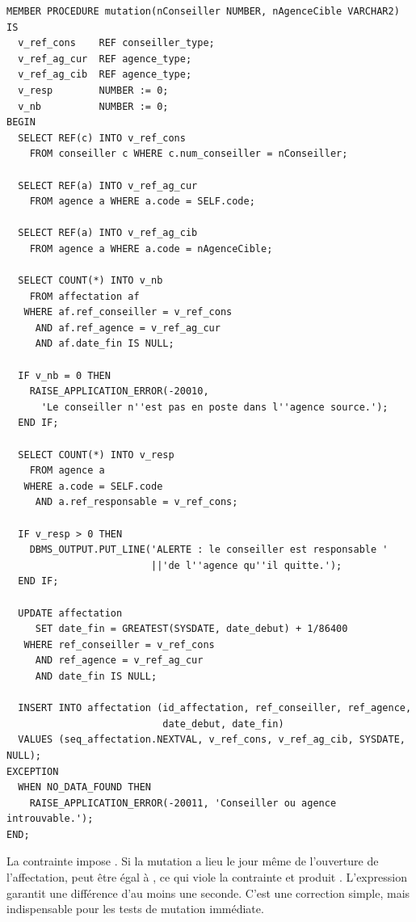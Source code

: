 \begin{lstlisting}[caption={Méthode \code{mutation} de la vue objet.},label={lst:e12-mutation}]
MEMBER PROCEDURE mutation(nConseiller NUMBER, nAgenceCible VARCHAR2) IS
  v_ref_cons    REF conseiller_type;
  v_ref_ag_cur  REF agence_type;
  v_ref_ag_cib  REF agence_type;
  v_resp        NUMBER := 0;
  v_nb          NUMBER := 0;
BEGIN
  SELECT REF(c) INTO v_ref_cons
    FROM conseiller c WHERE c.num_conseiller = nConseiller;

  SELECT REF(a) INTO v_ref_ag_cur
    FROM agence a WHERE a.code = SELF.code;

  SELECT REF(a) INTO v_ref_ag_cib
    FROM agence a WHERE a.code = nAgenceCible;

  SELECT COUNT(*) INTO v_nb
    FROM affectation af
   WHERE af.ref_conseiller = v_ref_cons
     AND af.ref_agence = v_ref_ag_cur
     AND af.date_fin IS NULL;

  IF v_nb = 0 THEN
    RAISE_APPLICATION_ERROR(-20010,
      'Le conseiller n''est pas en poste dans l''agence source.');
  END IF;

  SELECT COUNT(*) INTO v_resp
    FROM agence a
   WHERE a.code = SELF.code
     AND a.ref_responsable = v_ref_cons;

  IF v_resp > 0 THEN
    DBMS_OUTPUT.PUT_LINE('ALERTE : le conseiller est responsable '
                         ||'de l''agence qu''il quitte.');
  END IF;

  UPDATE affectation
     SET date_fin = GREATEST(SYSDATE, date_debut) + 1/86400
   WHERE ref_conseiller = v_ref_cons
     AND ref_agence = v_ref_ag_cur
     AND date_fin IS NULL;

  INSERT INTO affectation (id_affectation, ref_conseiller, ref_agence,
                           date_debut, date_fin)
  VALUES (seq_affectation.NEXTVAL, v_ref_cons, v_ref_ag_cib, SYSDATE, NULL);
EXCEPTION
  WHEN NO_DATA_FOUND THEN
    RAISE_APPLICATION_ERROR(-20011, 'Conseiller ou agence introuvable.');
END;
\end{lstlisting}

\begin{attentionbox}
La contrainte  impose . Si
la mutation a lieu le jour même de l'ouverture de l'affectation,
 peut être égal à , ce qui viole la contrainte
et produit . L'expression
 garantit une différence d'au
moins une seconde. C'est une correction simple, mais indispensable pour les
tests de mutation immédiate.
\end{attentionbox}

